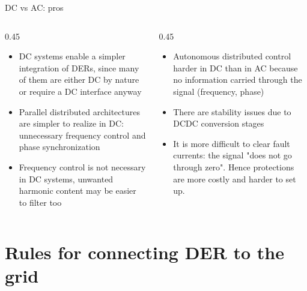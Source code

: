 \begin{frame}{DC vs AC: pros}

  \begin{columns}
  \begin{column}{0.45\textwidth}
  \begin{itemize}
  \item DC systems enable a simpler integration of DERs, since many of them are either DC by nature or require a DC interface anyway
  \item Parallel distributed architectures are simpler to realize in DC: unnecessary frequency control and phase synchronization
  \item Frequency control is not necessary in DC systems, unwanted harmonic content may be easier to filter too
  \end{itemize}
  \end{column}
  \begin{column}{0.45\textwidth}
    \begin{itemize}
      \item Autonomous distributed control harder in DC than in AC because no information carried through the signal (frequency, phase)
      \item There are stability issues due to DCDC conversion stages
      \item It is more difficult to clear fault currents: the signal "does not go through zero". Hence protections are more costly and harder to set up.
    \end{itemize}
  \end{column}
\end{columns}
\end{frame}

\section{Rules for connecting DER to the grid}

